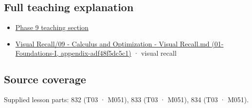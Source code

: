 \subsection{Full teaching explanation}\label{appendix-1a50e72435c2-full-teaching-explanation}

\begin{itemize}
\tightlist
\item
  \hyperref[02-foundations-ii-ch022-integration-and-quadrature]{Phase 9 teaching section}
\item
  \href{../01-Foundations-I/main.pdf\#nameddest=appendix-adf48f5dc5c1}{Visual Recall/09 - Calculus and Optimization - Visual Recall.md (01-Foundations-I, appendix-adf48f5dc5c1)} · visual recall
\end{itemize}

\subsection{Source coverage}\label{appendix-1a50e72435c2-source-coverage}

Supplied lesson parts: 832 (T03 · M051), 833 (T03 · M051), 834 (T03 · M051).
